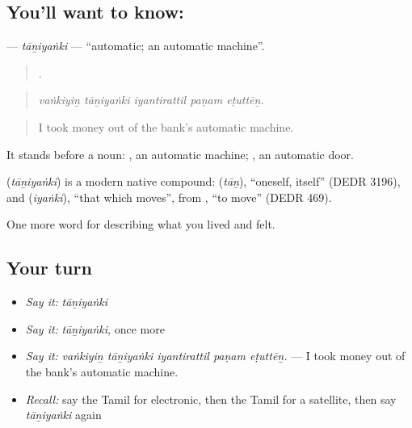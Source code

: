 \subsection*{You'll want to know: }
\textbf{} — \emph{tāṉiyaṅki} — \textquotedblleft{}automatic; an automatic machine\textquotedblright{}.

\begin{quote}
    .
\end{quote}

\begin{quote}
\emph{vaṅkiyiṉ tāṉiyaṅki iyantirattil paṇam eṭuttēṉ.}
\end{quote}

\begin{quote}
I took money out of the bank's automatic machine.
\end{quote}

It stands before a noun:  , an automatic machine;  , an automatic door.

\begin{cousinweb}
\textbf{} (\emph{tāṉiyaṅki}) is a modern native compound:  (\emph{tāṉ}), \textquotedblleft{}oneself, itself\textquotedblright{} (DEDR 3196), and  (\emph{iyaṅki}), \textquotedblleft{}that which moves\textquotedblright{}, from , \textquotedblleft{}to move\textquotedblright{} (DEDR 469).
\end{cousinweb}

\begin{grammarlens}[title={What you've built}]
One more word for describing what you lived and felt.
\end{grammarlens}

\subsection*{Your turn}
\begin{itemize}
\raggedright
  \item \emph{Say it:} \emph{tāṉiyaṅki}
  \item \emph{Say it:} \emph{tāṉiyaṅki}, once more
  \item \emph{Say it:} \emph{vaṅkiyiṉ tāṉiyaṅki iyantirattil paṇam eṭuttēṉ.} — I took money out of the bank's automatic machine.
  \item \emph{Recall:} say the Tamil for electronic, then the Tamil for a satellite, then say \emph{tāṉiyaṅki} again
\end{itemize}

